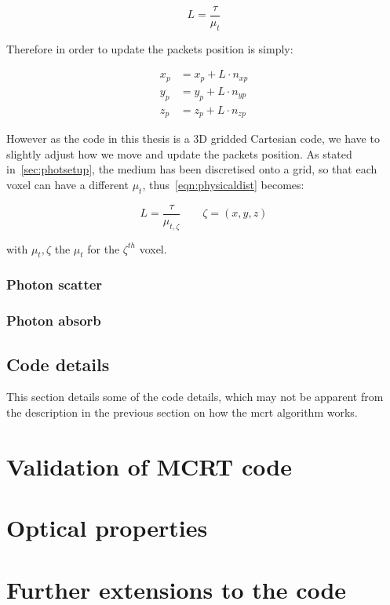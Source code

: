 \begin{equation}
L=\frac{\tau}{\mu_t}\label{eqn:physicaldist}
\end{equation}

Therefore in order to update the packets position is simply:

\begin{align}
x_p &= x_p+L\cdot n_{xp}\\
y_p &= y_p+L\cdot n_{yp}\\
z_p &= z_p+L\cdot n_{zp}
\end{align}

However as the code in this thesis is a 3D gridded Cartesian code, we have to slightly adjust how we move and update the packets position. As stated in~\cref{sec:photsetup}, the medium has been discretised onto a grid, so that each voxel can have a different $\mu_t$, thus~\cref{eqn:physicaldist} becomes:

\begin{equation}
L=\frac{\tau}{\mu_{t,\zeta}}\quad\quad \zeta=(x,y,z)
\end{equation}

with $\mu_t,\zeta$ the $\mu_t$ for the $\zeta^{th}$ voxel.



\subsubsection{Photon scatter}\label{sec:photscatter}

\subsubsection{Photon absorb}\label{sec:photabsorb}



\subsection{Code details}

This section details some of the code details, which may not be apparent from the description in the previous section on how the \gls{mcrt} algorithm works.

\section{Validation of MCRT code}
\section{Optical properties}\label{sec:optprop}
\section{Further extensions to the code}\label{sec:codefurther}